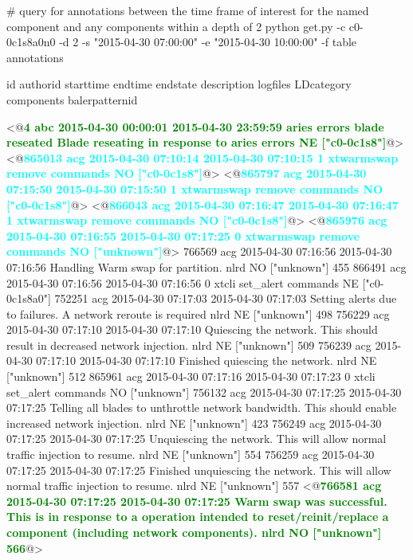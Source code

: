 \begin{figure*}
\begin{annol}

# query for annotations between the time frame of interest for the named component and any components within a depth of 2
python get.py  -c c0-0c1s8a0n0 -d 2 -s "2015-04-30 07:00:00" -e "2015-04-30 10:00:00" -f table annotations

id	authorid	starttime	endtime		endstate    description	logfiles	LDcategory	components	balerpatternid

<@\textbf{\textcolor{green}{4	abc	2015-04-30 00:00:01	2015-04-30 23:59:59	aries errors	blade reseated	Blade reseating in response to aries errors	NE	["c0-0c1s8"]}}@>
<@\textbf{\textcolor{cyan}{865013	acg	2015-04-30 07:10:14	2015-04-30 07:10:15	1	xtwarmswap remove	commands	NO	["c0-0c1s8"]}}@>
<@\textbf{\textcolor{cyan}{865797	acg	2015-04-30 07:15:50	2015-04-30 07:15:50	1	xtwarmswap remove	commands	NO	["c0-0c1s8"]}}@>
<@\textbf{\textcolor{cyan}{866043	acg	2015-04-30 07:16:47	2015-04-30 07:16:47	1	xtwarmswap remove	commands	NO	["c0-0c1s8"]}}@>
<@\textbf{\textcolor{cyan}{865976	acg	2015-04-30 07:16:55	2015-04-30 07:17:25	0	xtwarmswap remove	commands	NO	["unknown"]}}@>
766569	acg	2015-04-30 07:16:56	2015-04-30 07:16:56		Handling Warm swap for partition.	nlrd	NO	["unknown"]	455
866491	acg	2015-04-30 07:16:56	2015-04-30 07:16:56	0	xtcli set_alert		commands	NE	["c0-0c1s8a0"]
752251	acg	2015-04-30 07:17:03	2015-04-30 07:17:03		Setting alerts due to failures. A network reroute is required	nlrd	NE	["unknown"]	498
756229	acg	2015-04-30 07:17:10	2015-04-30 07:17:10		Quiescing the network. This should result in decreased network injection.	nlrd	NE	["unknown"]	509
756239	acg	2015-04-30 07:17:10	2015-04-30 07:17:10		Finished quiescing the network. 	nlrd	NE	["unknown"]	512
865961	acg	2015-04-30 07:17:16	2015-04-30 07:17:23	0	xtcli set_alert		commands	NO	["unknown"]
756132	acg	2015-04-30 07:17:25	2015-04-30 07:17:25		Telling all blades to unthrottle network bandwidth. This should enable increased network injection.	nlrd	NE	["unknown"]	423
756249	acg	2015-04-30 07:17:25	2015-04-30 07:17:25		Unquiescing the network. This will allow normal traffic injection to resume.	nlrd	NE	["unknown"]	554
756259	acg	2015-04-30 07:17:25	2015-04-30 07:17:25		Finished unquiescing the network. This will allow normal traffic injection to resume.	nlrd	NE	["unknown"]	557
<@\textbf{\textcolor{green}{766581	acg	2015-04-30 07:17:25	2015-04-30 07:17:25		Warm swap was successful. This is in response to a operation intended to reset/reinit/replace a component (including network components).	nlrd	NO	["unknown"]	566}}@>

\end{annol}
\end{figure*}
